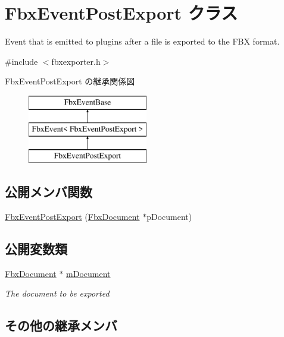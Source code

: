 \hypertarget{class_fbx_event_post_export}{}\section{Fbx\+Event\+Post\+Export クラス}
\label{class_fbx_event_post_export}


Event that is emitted to plugins after a file is exported to the F\+BX format.  




{\ttfamily \#include $<$fbxexporter.\+h$>$}

Fbx\+Event\+Post\+Export の継承関係図\begin{figure}[H]
\begin{center}
\leavevmode
\includegraphics[height=3.000000cm]{class_fbx_event_post_export}
\end{center}
\end{figure}
\subsection*{公開メンバ関数}
\begin{DoxyCompactItemize}
\item 
\hyperlink{class_fbx_event_post_export_ab35efa8c72530d563f35128018c9bfcc}{Fbx\+Event\+Post\+Export} (\hyperlink{class_fbx_document}{Fbx\+Document} $\ast$p\+Document)
\end{DoxyCompactItemize}
\subsection*{公開変数類}
\begin{DoxyCompactItemize}
\item 
\hyperlink{class_fbx_document}{Fbx\+Document} $\ast$ \hyperlink{class_fbx_event_post_export_aca668d4ffcd12dc1b6455bb5165fb2f5}{m\+Document}
\begin{DoxyCompactList}\small\item\em The document to be exported \end{DoxyCompactList}\end{DoxyCompactItemize}
\subsection*{その他の継承メンバ}


